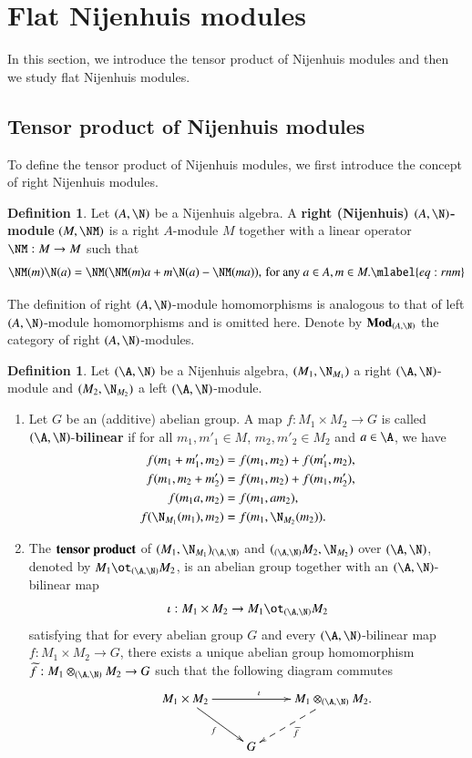\documentclass[12pt]{amsart}
\theoremstyle{definition}
\newtheorem{defn}[theorem]{Definition}
\begin{document}
\section{Flat Nijenhuis modules}

In this section, we introduce the tensor product of Nijenhuis modules and then we study flat Nijenhuis modules.

\subsection{Tensor product of Nijenhuis modules}
To define the tensor product of Nijenhuis modules, we first introduce the concept of right Nijenhuis modules.

\begin{defn}
Let $(A,\N)$ be a Nijenhuis algebra. A {\bf right (Nijenhuis) $(A,\N)$-module} $(M,\NM)$ is a
right $A$-module $M$ together with a linear operator $\NM: M \to M$ such that
\begin{align}
\NM(m) \N(a)=\NM( \NM(m)a + m\N(a)-\NM (ma)), \, \text{for any } a\in A, m\in M. \mlabel{eq:rnm}
\end{align}
\end{defn}

The definition of right $(A,\N)$-module homomorphisms is analogous to that of left $(A,\N)$-module homomorphisms and is omitted here.
Denote by ${\bf Mod}_{(A,\N)}$ the category of right $(A,\N)$-modules.


\begin{defn}
Let $(\A,\N)$ be a Nijenhuis algebra, $(M_1,\N_{M_1})$  a right $(\A,\N)$-module and $(M_2,\N_{M_2})$ a left $(\A,\N)$-module.
\begin{enumerate}
\item
Let $G$ be an (additive) abelian group. A map $f: M_1 \times M_2 \rightarrow G$ is called $(\A,\N)$-{\bf bilinear} if for all $m_1, m'_1\in M$, $m_2, m'_2\in M_2$ and $a \in \A$, we have
\begin{align*}
f(m_1+m'_1, m_2)&=f(m_1, m_2)+f(m'_1, m_2),\\
f(m_1, m_2+m'_2)&=f(m_1, m_2)+f(m_1, m'_2),\\
f(m_1 a, m_2)&=f(m_1, am_2),\\
f(\N_{M_1}(m_1), m_2)&=f(m_1, \N_{M_2}(m_2)).
\end{align*}
\item
The ${\bf tensor~product}$ of  $(M_1,\N_{M_1})_{(\A,\N)}$ and $(_{(\A,\N)}M_2,\N_{M_2})$ over $(\A,\N)$, denoted by $M_1 \ot_{(\A,\N)} M_2$, is an abelian group together with
an $(\A,\N)$-bilinear map
$$ \iota: M_1 \times M_2 \rightarrow M_1\ot_{(\A,\N)} M_2$$ satisfying that for every abelian group $G$ and every $(\A,\N)$-bilinear map $f: M_1 \times M_2 \rightarrow G$,
there exists a unique abelian group homomorphism $\widetilde{f}: M_1 \otimes_{(\A,\N)} M_2 \rightarrow G$ such that the following diagram commutes
$$
\xymatrix{
&M_1\times M_2 \ar^{\iota}[rr] \ar_{f}[dr]&&M_1 \otimes_{(\A,\N)} M_2.\ar@{-->}^{\widetilde{f}}[dl]\\
&&G&}
$$
\end{enumerate}
%
\end{defn}
\end{document}

